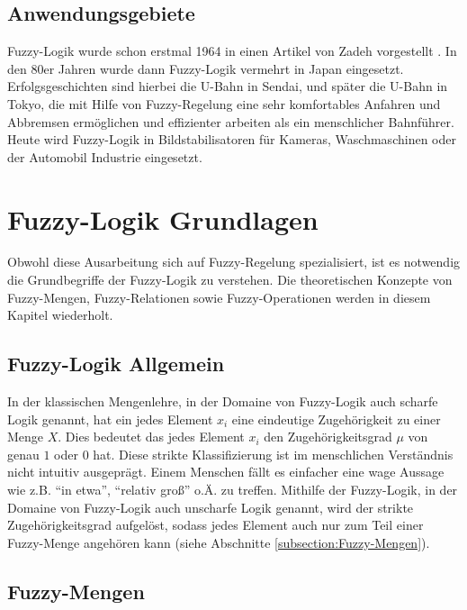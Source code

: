 \documentclass[12pt,a4paper,bibliography=totocnumbered,listof=totocnumbered, abstracton]{scrartcl}
\theoremstyle{Umgebung}
\begin{document}
\subsection{Anwendungsgebiete}

Fuzzy-Logik wurde schon erstmal 1964 in einen Artikel von Zadeh vorgestellt \cite{zadeh1965fuzzy}. In den 80er Jahren wurde dann Fuzzy-Logik vermehrt in Japan eingesetzt. Erfolgsgeschichten sind hierbei die U-Bahn in Sendai, und später die U-Bahn in Tokyo, die mit Hilfe von Fuzzy-Regelung eine sehr komfortables Anfahren und Abbremsen ermöglichen und effizienter arbeiten als ein menschlicher Bahnführer. Heute wird Fuzzy-Logik in Bildstabilisatoren für Kameras, Waschmaschinen oder der Automobil Industrie eingesetzt.

\section{Fuzzy-Logik Grundlagen}

Obwohl diese Ausarbeitung sich auf Fuzzy-Regelung spezialisiert, ist es notwendig die Grundbegriffe der Fuzzy-Logik zu verstehen. Die theoretischen Konzepte von Fuzzy-Mengen, Fuzzy-Relationen sowie Fuzzy-Operationen werden in diesem Kapitel wiederholt.

\subsection{Fuzzy-Logik Allgemein}

In der klassischen Mengenlehre, in der Domaine von Fuzzy-Logik auch scharfe Logik genannt, hat ein jedes Element $x_i$ eine eindeutige Zugehörigkeit zu einer Menge $X$. Dies bedeutet das jedes Element $x_i$ den Zugehörigkeitsgrad $\mu$ von genau $1$ oder $0$ hat. Diese strikte Klassifizierung ist im menschlichen Verständnis nicht intuitiv ausgeprägt. Einem Menschen fällt es einfacher eine wage Aussage wie z.B. \enquote{in etwa}, \enquote{relativ groß} o.Ä. zu treffen. Mithilfe der Fuzzy-Logik, in der Domaine von Fuzzy-Logik auch unscharfe Logik genannt, wird der strikte Zugehörigkeitsgrad aufgelöst, sodass jedes Element auch nur zum Teil einer Fuzzy-Menge angehören kann (siehe Abschnitte \ref{subsection:Fuzzy-Mengen}).

\label{subsection:Fuzzy-Mengen}
\subsection{Fuzzy-Mengen}
\end{document}
